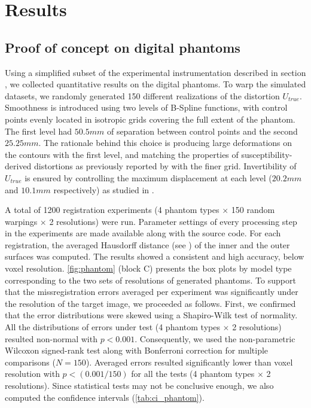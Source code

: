 \section*{Results}
\label{sec:results}

\subsection*{Proof of concept on digital phantoms}
\label{sec:results_phantom}
Using a simplified subset of the experimental instrumentation described in section
  , we collected quantitative results on the digital
  phantoms.
To warp the simulated datasets, we randomly generated 150 different realizations of
  the distortion $U_{true}$.
Smoothness is introduced using two levels of B-Spline functions, with control points evenly
  located in isotropic grids covering the full extent of the phantom.
The first level had $50.5mm$ of separation between control points and the second $25.25mm$.
The rationale behind this choice is producing large deformations on the contours with
  the first level, and matching the properties of susceptibility-derived distortions
  as previously reported by \cite{irfanoglu_susceptibility_2011} with the finer grid.
Invertibility of $U_{true}$ is ensured by controlling the maximum displacement at each
  level ($20.2mm$ and $10.1mm$ respectively) as studied in \citep{rueckert_diffeomorphic_2006}.

A total of 1200 registration experiments (4 phantom types $\times$ 150 random warpings
  $\times$ 2 resolutions) were run.
Parameter settings of every processing step in the experiments are made available along with
  the source code.
For each registration, the averaged Hausdorff distance (see )
  of the inner and the outer surfaces was computed.
The results showed a consistent and high accuracy, below voxel resolution.
\autoref{fig:phantom} (block C) presents the box plots by model type corresponding
  to the two sets of resolutions of generated phantoms.
To support that the missregistration errors averaged per experiment was significantly
  under the resolution of the target image, we proceeded as follows.
First, we confirmed that the error distributions were skewed using a Shapiro-Wilk test of
  normality.
All the distributions of errors under test (4 phantom types $\times$ 2 resolutions) resulted
  non-normal with $p<0.001$.
Consequently, we used the non-parametric Wilcoxon signed-rank test along with Bonferroni
  correction for multiple comparisons ($N=150$).
Averaged errors resulted significantly lower than voxel resolution with $p < (0.001 / 150)$
  for all the tests (4 phantom types $\times$ 2 resolutions).
Since statistical tests may not be conclusive enough, we also computed the confidence intervals
  (\autoref{tab:ci_phantom}).


